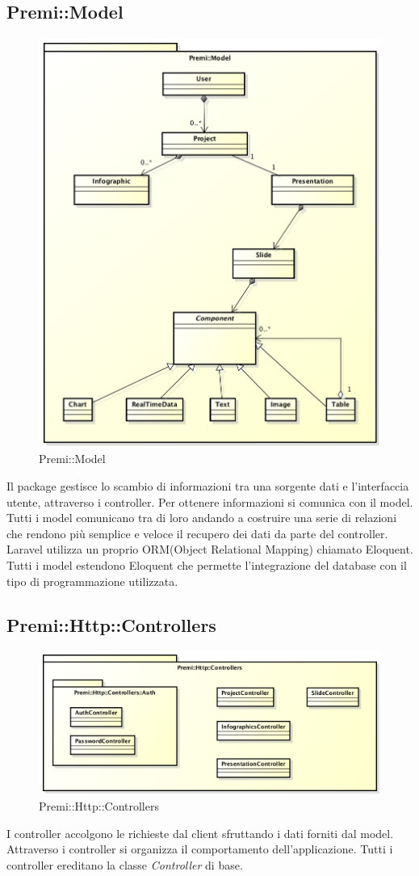 \subsection{Premi::Model}
	\begin{figure}[h]
		\centering
		\includegraphics[width=0.7\linewidth]{img/back_end_premi_model}
		\caption[Premi::Model]{Premi::Model}
		\label{fig:back_end_premi_model}
	\end{figure}

	
Il package gestisce lo scambio di informazioni tra una sorgente dati e l'interfaccia utente, attraverso i controller. Per ottenere informazioni si comunica con il model. Tutti i model comunicano tra di loro andando a costruire una serie di relazioni che rendono più semplice e veloce il recupero dei dati da parte del controller. Laravel utilizza un proprio ORM(Object Relational Mapping) chiamato Eloquent. Tutti i model estendono Eloquent che permette l'integrazione del database con il tipo di programmazione utilizzata.

\newpage



\newpage
\subsection{Premi::Http::Controllers}
	\begin{figure}[h]
		\centering
		\includegraphics[width=0.7\linewidth]{img/back_end_premi_http_controllers}
		\caption[Premi::Http::Controllers]{Premi::Http::Controllers}
		\label{fig:back_end_premi_http_controllers}
	\end{figure}

I controller accolgono le richieste dal client sfruttando i dati forniti dal model. Attraverso i controller si organizza il comportamento dell'applicazione. Tutti i controller ereditano la classe \textit{Controller} di base.



